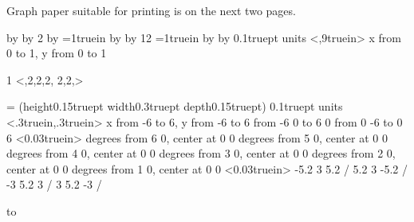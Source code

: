 Graph paper suitable for printing is on the next two pages.
\vfill\eject 

\newcount\gridresolution
{}   %
\newif\ifdashed
\dashedtrue         %
%
\newcount\xmax
{} \multiply\xmax by \gridresolution \divide\xmax by 2
\newcount\ymax
{} \multiply\ymax by \gridresolution
\newdimen\dashsize
\dashsize=1truein
\divide\dashsize by \gridresolution
\divide\dashsize by 12
%
%
\newdimen\xsize \xsize=1truein
\multiply\xsize by \xmax
\divide\xsize by \gridresolution
%
\beginpicture
\linethickness0.1truept
\setcoordinatesystem units <\xsize,9truein>
\setplotarea x from 0 to 1, y from 0 to 1
\ifdashed
{} {1}
\setdashpattern <\dashsize,2\dashsize,2\dashsize,2\dashsize,%
                 2\dashsize,2\dashsize,\dashsize>
\fi
\grid {\xmax} {\ymax}
\endpicture
\vfill\eject

\newbox\graph
\setbox\graph=\vbox{\null\beginpicture
\setplotsymbol({\vrule height0.15truept width0.3truept depth0.15truept})
\linethickness0.1truept
\setcoordinatesystem units <.3truein,.3truein>
\setplotarea x from -6 to 6, y from -6 to 6
\putrule from -6 0 to 6 0
\putrule from 0 -6 to 0 6
\setdots <0.03truein>
 degrees from 6 0, center at 0 0
 degrees from 5 0, center at 0 0
 degrees from 4 0, center at 0 0
 degrees from 3 0, center at 0 0
 degrees from 2 0, center at 0 0
 degrees from 1 0, center at 0 0
\setdots <0.03truein>
\setlinear
{} -5.2 3 5.2 /
 5.2 3 -5.2 /
 -3 5.2 3 /
 3 5.2 -3 /
\endpicture\null}

\offinterlineskip
\vbox to \vsize{
\leftline{\copy\graph}
\vss
\rightline{\copy\graph}
\vss
\leftline{\copy\graph}
}

